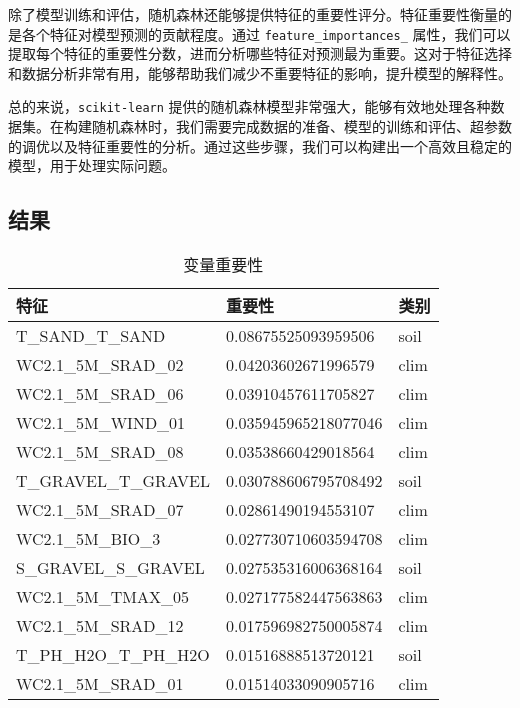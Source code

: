 \documentclass[AutoFakeBold]{LZUThesis-PgD&PhD}
\begin{document}
        除了模型训练和评估，随机森林还能够提供特征的重要性评分。特征重要性衡量的是各个特征对模型预测的贡献程度。通过 \texttt{feature\_importances\_} 属性，我们可以提取每个特征的重要性分数，进而分析哪些特征对预测最为重要。这对于特征选择和数据分析非常有用，能够帮助我们减少不重要特征的影响，提升模型的解释性。
        
        总的来说，\texttt{scikit-learn} 提供的随机森林模型非常强大，能够有效地处理各种数据集。在构建随机森林时，我们需要完成数据的准备、模型的训练和评估、超参数的调优以及特征重要性的分析。通过这些步骤，我们可以构建出一个高效且稳定的模型，用于处理实际问题。
            
        \subsection{结果}
	\begin{table}[H]
		\centering
		\begin{tabular}{|l|l|l|}
			\hline
			\textbf{特征}                         & \textbf{重要性}    & \textbf{类别} \\ \hline
			T\_SAND\_T\_SAND                       & 0.08675525093959506 & soil          \\ \hline
			WC2.1\_5M\_SRAD\_02                    & 0.04203602671996579 & clim          \\ \hline
			WC2.1\_5M\_SRAD\_06                    & 0.03910457611705827 & clim          \\ \hline
			WC2.1\_5M\_WIND\_01                    & 0.035945965218077046 & clim         \\ \hline
			WC2.1\_5M\_SRAD\_08                    & 0.03538660429018564 & clim          \\ \hline
			T\_GRAVEL\_T\_GRAVEL                   & 0.030788606795708492 & soil         \\ \hline
			WC2.1\_5M\_SRAD\_07                    & 0.02861490194553107 & clim          \\ \hline
			WC2.1\_5M\_BIO\_3                       & 0.027730710603594708 & clim         \\ \hline
			S\_GRAVEL\_S\_GRAVEL                   & 0.027535316006368164 & soil          \\ \hline
			WC2.1\_5M\_TMAX\_05                    & 0.027177582447563863 & clim         \\ \hline
			WC2.1\_5M\_SRAD\_12                    & 0.017596982750005874 & clim         \\ \hline
			T\_PH\_H2O\_T\_PH\_H2O                 & 0.01516888513720121  & soil         \\ \hline
			WC2.1\_5M\_SRAD\_01                    & 0.01514033090905716 & clim          \\ \hline
		\end{tabular}
		\caption{变量重要性}
		\label{tab:variable_importance}
	\end{table}
	
\end{document}
